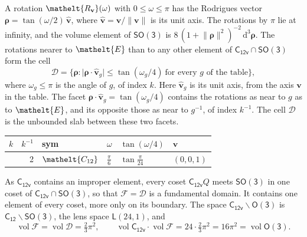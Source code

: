 \documentclass[10pt,a4paper]{article}
\numberwithin{equation}{section}
\newcommand{\eltfont}[1]{{\let\sigma\eltsigma\mathelt{#1}}}
\newcommand{\grp}[1]{\mathsf{#1}}
\newcommand{\cls}[1]{\eltfont{#1}}
\newcommand{\elt}[1]{\eltfont{#1}}
\newcommand{\dirvec}[3]{(#1, #2, #3)}
\newcommand{\unitaxis}{\hat{\mathbf{v}}}
\newcommand{\vv}{\mathbf{v}}
\newcommand{\diff}{\mathrm{d}}
\newcommand{\vol}{\operatorname{vol}}
\newcommand{\rodrigues}{\boldsymbol{\rho}}
\newcommand{\fcell}{\mathcal{D}}
\newcommand{\fdomain}{\mathcal{F}}
\newcommand{\lensspace}[2]{\mathsf{L}(#1, #2)}
\begin{document}
\leavevmode\label{n:vector.rodrigues}\label{n:vector.unitaxis}A rotation $\elt{R_{\vv}}(\omega)$ with $0 \le \omega \le \pi$ has the Rodrigues vector $\rodrigues = \tan(\omega/2)\,\unitaxis$, where $\unitaxis = \vv/\lVert\vv\rVert$ is its unit axis. The rotations by $\pi$ lie at infinity, and the volume element of \href{SO3.pdf}{$\grp{SO(3)}$} is $8\,(1 + \lVert\rodrigues\rVert^2)^{-2}\,\diff^3\rodrigues$.
\leavevmode\label{n:set.cell}The rotations nearer to $\elt{E}$ than to any other element of $\grp{C_{12v}} \cap \grp{SO(3)}$ form the cell
\begin{equation}\label{e:cell}\fcell = \bigl\{\rodrigues : \lvert\rodrigues\cdot\unitaxis_g\rvert \le \tan(\omega_g/4)\ \text{for every $g$ of the table}\bigr\},\end{equation}
where $\omega_g \le \pi$ is the angle of $g$, of index $k$. Here $\unitaxis_g$ is its unit axis, from the axis $\vv$ in the table. The facet $\rodrigues\cdot\unitaxis_g = \tan(\omega_g/4)$ contains the rotations as near to $g$ as to $\elt{E}$, and its opposite those as near to $g^{-1}$, of index $k^{-1}$. The cell $\fcell$ is the unbounded slab between these two facets.
{\small{\renewcommand{\arraystretch}{1.3}\begin{longtable}{@{}rrllll@{}}\toprule
$k$ & $k^{-1}$ & sym & $\omega$ & $\tan(\omega/4)$ & $\vv$\\\midrule\endhead
\bottomrule\endfoot\endlastfoot
1 & 2 & $\cls{C_{12}}$ & $\tfrac{\pi}{6}$ & $\tan\tfrac{\pi}{24}$ & $\dirvec{0}{0}{1}$\\
\bottomrule\end{longtable}}}

\leavevmode\label{n:set.fundamental}As $\grp{C_{12v}}$ contains an improper element, every coset $\grp{C_{12v}}Q$ meets \href{SO3.pdf}{$\grp{SO(3)}$} in one coset of $\grp{C_{12v}} \cap \grp{SO(3)}$, so that $\fdomain = \fcell$ is a fundamental domain. It contains one element of every coset, more only on its boundary.
\leavevmode\label{n:set.lens}The space $\grp{C_{12v}}\backslash\grp{O(3)}$ is $\grp{C_{12}}\backslash\grp{SO(3)}$, the lens space $\lensspace{24}{1}$, and
\begin{equation}\label{e:volume}\vol\fdomain = \vol\fcell = \tfrac{2}{3}\pi^2,\qquad \vol\grp{C_{12v}}\cdot\vol\fdomain = 24\cdot \tfrac{2}{3}\pi^2 = 16\pi^2 = \vol\grp{O(3)}.\end{equation}
\end{document}
